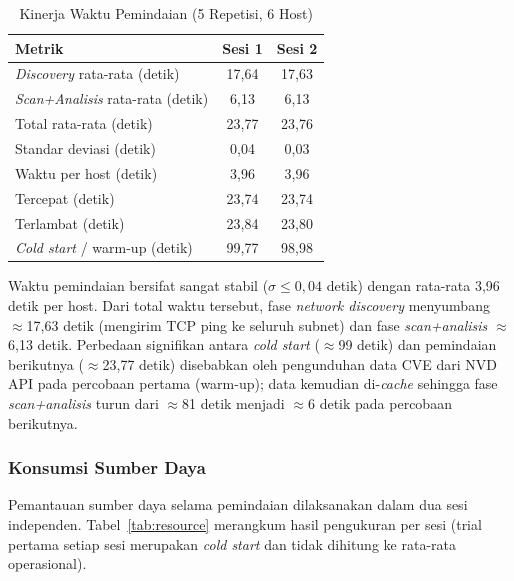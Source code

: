 \documentclass[conference]{IEEEtran}
\begin{document}
\begin{table}[htbp]
\caption{Kinerja Waktu Pemindaian (5 Repetisi, 6 Host)}
\label{tab:kecepatan}
\renewcommand{\arraystretch}{1.2}
\begin{tabular}{|l|c|c|}
\hline
\textbf{Metrik} & \textbf{Sesi 1} & \textbf{Sesi 2} \\
\hline
\textit{Discovery} rata-rata (detik)     & 17,64 & 17,63 \\
\hline
\textit{Scan+Analisis} rata-rata (detik) & 6,13  & 6,13  \\
\hline
Total rata-rata (detik)                  & 23,77 & 23,76 \\
\hline
Standar deviasi (detik)                  & 0,04  & 0,03  \\
\hline
Waktu per host (detik)                   & 3,96  & 3,96  \\
\hline
Tercepat (detik)                         & 23,74 & 23,74 \\
\hline
Terlambat (detik)                        & 23,84 & 23,80 \\
\hline
\textit{Cold start} / warm-up (detik)   & 99,77 & 98,98 \\
\hline
\end{tabular}
\end{table}

Waktu pemindaian bersifat sangat stabil ($\sigma \leq 0{,}04$ detik) dengan rata-rata 3,96 detik per host. Dari total waktu tersebut, fase \textit{network discovery} menyumbang $\approx$17,63 detik (mengirim TCP ping ke seluruh subnet) dan fase \textit{scan+analisis} $\approx$6,13 detik. Perbedaan signifikan antara \textit{cold start} ($\approx$99 detik) dan pemindaian berikutnya ($\approx$23,77 detik) disebabkan oleh pengunduhan data CVE dari NVD API pada percobaan pertama (warm-up); data kemudian di-\textit{cache} sehingga fase \textit{scan+analisis} turun dari $\approx$81 detik menjadi $\approx$6 detik pada percobaan berikutnya.

\subsubsection{Konsumsi Sumber Daya}

Pemantauan sumber daya selama pemindaian dilaksanakan dalam dua sesi independen. Tabel~\ref{tab:resource} merangkum hasil pengukuran per sesi (trial pertama setiap sesi merupakan \textit{cold start} dan tidak dihitung ke rata-rata operasional).
\end{document}
